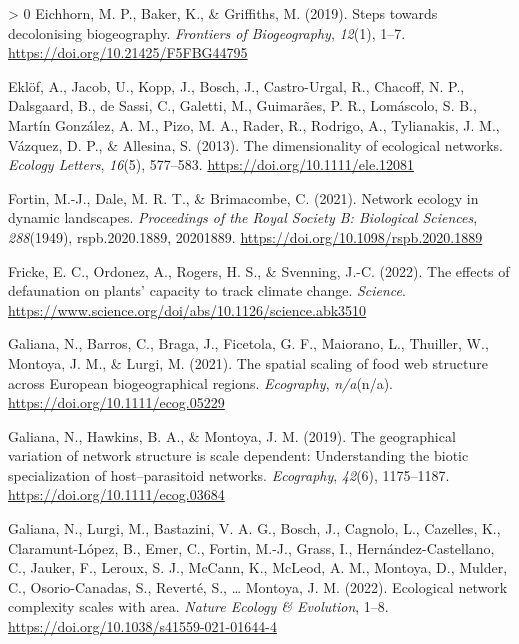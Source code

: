\documentclass[11pt]{article}
\newlength{\cslhangindent}
\newenvironment{CSLReferences}[3] %
 {%
  \setlength{\parindent}{0pt}
  \ifodd #1 \everypar{\setlength{\hangindent}{\cslhangindent}}\ignorespaces\fi
  \ifnum #2 > 0
  \setlength{\parskip}{#2\baselineskip}
  \fi
 }%
 {}
\begin{document}
\begin{CSLReferences}{1}{0}
\leavevmode\hypertarget{ref-Eichhorn2019SteDec}{}%
Eichhorn, M. P., Baker, K., \& Griffiths, M. (2019). Steps towards
decolonising biogeography. \emph{Frontiers of Biogeography},
\emph{12}(1), 1--7. \url{https://doi.org/10.21425/F5FBG44795}

\leavevmode\hypertarget{ref-Eklof2013DimEco}{}%
Eklöf, A., Jacob, U., Kopp, J., Bosch, J., Castro-Urgal, R., Chacoff, N.
P., Dalsgaard, B., de Sassi, C., Galetti, M., Guimarães, P. R.,
Lomáscolo, S. B., Martín González, A. M., Pizo, M. A., Rader, R.,
Rodrigo, A., Tylianakis, J. M., Vázquez, D. P., \& Allesina, S. (2013).
The dimensionality of ecological networks. \emph{Ecology Letters},
\emph{16}(5), 577--583. \url{https://doi.org/10.1111/ele.12081}

\leavevmode\hypertarget{ref-Fortin2021NetEco}{}%
Fortin, M.-J., Dale, M. R. T., \& Brimacombe, C. (2021). Network ecology
in dynamic landscapes. \emph{Proceedings of the Royal Society B:
Biological Sciences}, \emph{288}(1949), rspb.2020.1889, 20201889.
\url{https://doi.org/10.1098/rspb.2020.1889}

\leavevmode\hypertarget{ref-Fricke2022EffDef}{}%
Fricke, E. C., Ordonez, A., Rogers, H. S., \& Svenning, J.-C. (2022).
The effects of defaunation on plants' capacity to track climate change.
\emph{Science}.
\url{https://www.science.org/doi/abs/10.1126/science.abk3510}

\leavevmode\hypertarget{ref-Galiana2021SpaSca}{}%
Galiana, N., Barros, C., Braga, J., Ficetola, G. F., Maiorano, L.,
Thuiller, W., Montoya, J. M., \& Lurgi, M. (2021). The spatial scaling
of food web structure across European biogeographical regions.
\emph{Ecography}, \emph{n/a}(n/a).
\url{https://doi.org/10.1111/ecog.05229}

\leavevmode\hypertarget{ref-Galiana2019GeoVar}{}%
Galiana, N., Hawkins, B. A., \& Montoya, J. M. (2019). The geographical
variation of network structure is scale dependent: Understanding the
biotic specialization of host--parasitoid networks. \emph{Ecography},
\emph{42}(6), 1175--1187. \url{https://doi.org/10.1111/ecog.03684}

\leavevmode\hypertarget{ref-Galiana2022EcoNet}{}%
Galiana, N., Lurgi, M., Bastazini, V. A. G., Bosch, J., Cagnolo, L.,
Cazelles, K., Claramunt-López, B., Emer, C., Fortin, M.-J., Grass, I.,
Hernández-Castellano, C., Jauker, F., Leroux, S. J., McCann, K., McLeod,
A. M., Montoya, D., Mulder, C., Osorio-Canadas, S., Reverté, S.,
\ldots{} Montoya, J. M. (2022). Ecological network complexity scales
with area. \emph{Nature Ecology \& Evolution}, 1--8.
\url{https://doi.org/10.1038/s41559-021-01644-4}


\end{CSLReferences}
\end{document}

